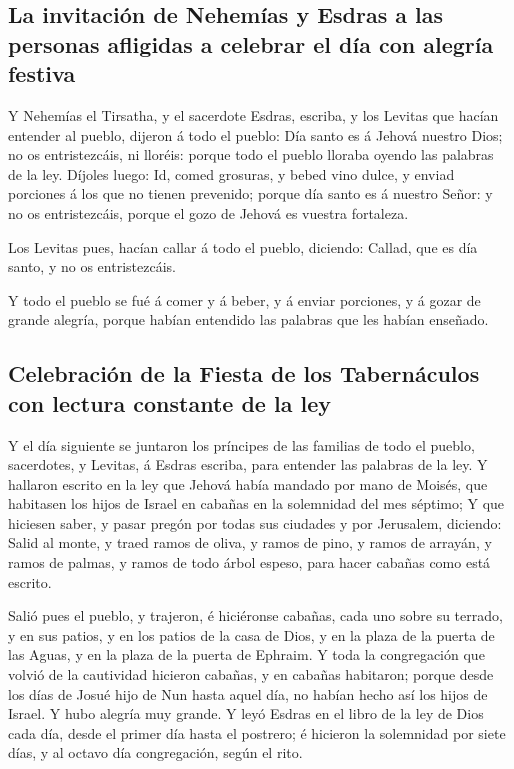 \hypertarget{la-invitaciuxf3n-de-nehemuxedas-y-esdras-a-las-personas-afligidas-a-celebrar-el-duxeda-con-alegruxeda-festiva}{%
\subsection{La invitación de Nehemías y Esdras a las personas afligidas
a celebrar el día con alegría
festiva}\label{la-invitaciuxf3n-de-nehemuxedas-y-esdras-a-las-personas-afligidas-a-celebrar-el-duxeda-con-alegruxeda-festiva}}

 Y Nehemías el Tirsatha, y el sacerdote Esdras, escriba, y
los Levitas que hacían entender al pueblo, dijeron á todo el pueblo: Día
santo es á Jehová nuestro Dios; no os entristezcáis, ni lloréis: porque
todo el pueblo lloraba oyendo las palabras de la ley. 
Díjoles luego: Id, comed grosuras, y bebed vino dulce, y enviad
porciones á los que no tienen prevenido; porque día santo es á nuestro
Señor: y no os entristezcáis, porque el gozo de Jehová es vuestra
fortaleza.

 Los Levitas pues, hacían callar á todo el pueblo,
diciendo: Callad, que es día santo, y no os entristezcáis.

 Y todo el pueblo se fué á comer y á beber, y á enviar
porciones, y á gozar de grande alegría, porque habían entendido las
palabras que les habían enseñado.

\hypertarget{celebraciuxf3n-de-la-fiesta-de-los-tabernuxe1culos-con-lectura-constante-de-la-ley}{%
\subsection{Celebración de la Fiesta de los Tabernáculos con lectura
constante de la
ley}\label{celebraciuxf3n-de-la-fiesta-de-los-tabernuxe1culos-con-lectura-constante-de-la-ley}}

 Y el día siguiente se juntaron los príncipes de las
familias de todo el pueblo, sacerdotes, y Levitas, á Esdras escriba,
para entender las palabras de la ley.  Y hallaron escrito
en la ley que Jehová había mandado por mano de Moisés, que habitasen los
hijos de Israel en cabañas en la solemnidad del mes séptimo;
 Y que hiciesen saber, y pasar pregón por todas sus
ciudades y por Jerusalem, diciendo: Salid al monte, y traed ramos de
oliva, y ramos de pino, y ramos de arrayán, y ramos de palmas, y ramos
de todo árbol espeso, para hacer cabañas como está escrito.

 Salió pues el pueblo, y trajeron, é hiciéronse cabañas,
cada uno sobre su terrado, y en sus patios, y en los patios de la casa
de Dios, y en la plaza de la puerta de las Aguas, y en la plaza de la
puerta de Ephraim.  Y toda la congregación que volvió de la
cautividad hicieron cabañas, y en cabañas habitaron; porque desde los
días de Josué hijo de Nun hasta aquel día, no habían hecho así los hijos
de Israel. Y hubo alegría muy grande.  Y leyó Esdras en el
libro de la ley de Dios cada día, desde el primer día hasta el postrero;
é hicieron la solemnidad por siete días, y al octavo día congregación,
según el rito.

